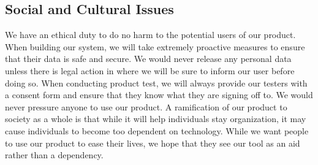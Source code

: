 \subsection{Social and Cultural Issues}
We have an ethical duty to do no harm to the potential users of our product. When building our system, we will take extremely proactive measures to ensure that their data is safe and secure. We would never release any personal data unless there is legal action in where we will be sure to inform our user before doing so. When conducting product test, we will always provide our testers with a consent form and ensure that they know what they are signing off to. We would never pressure anyone to use our product. A ramification of our product to society as a whole is that while it will help individuals stay organization, it may cause individuals to become too dependent on technology. While we want people to use our product to ease their lives, we hope that they see our tool as an aid rather than a dependency.

